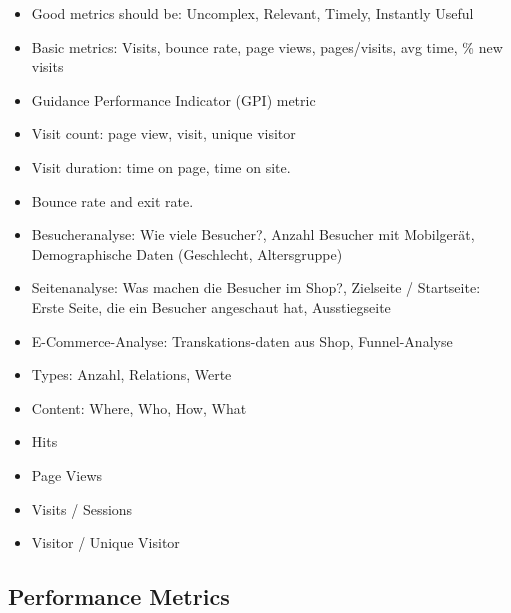 \begin{itemize}
\item Good metrics should be: Uncomplex, Relevant, Timely, Instantly Useful
\item Basic metrics: Visits, bounce rate, page views, pages/visits, avg time, \% new visits
\item Guidance Performance Indicator (GPI) metric
\end{itemize}


\begin{itemize}
\item Visit count: page view, visit, unique visitor
\item Visit duration: time on page, time on site.
\item Bounce rate and exit rate.
\end{itemize}



\begin{itemize}
\item Besucheranalyse: Wie viele Besucher?, Anzahl Besucher mit Mobilgerät, Demographische Daten (Geschlecht, Altersgruppe)
\item Seitenanalyse: Was machen die Besucher im Shop?, Zielseite / Startseite: Erste Seite, die ein Besucher angeschaut hat, Ausstiegseite
\item E-Commerce-Analyse: Transkations-daten aus Shop, Funnel-Analyse
\end{itemize}


\begin{itemize}
\item Types: Anzahl, Relations, Werte
\item Content: Where, Who, How, What
\item Hits
\item Page Views
\item Visits / Sessions
\item Visitor / Unique Visitor
\end{itemize}














\subsection{Performance Metrics}

